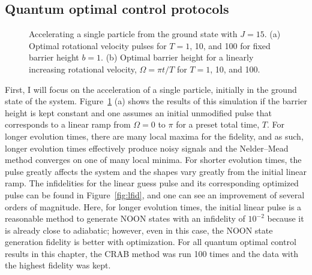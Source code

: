 \subsection{Quantum optimal control protocols}

\begin{figure}
 \centering
 \caption{Accelerating a single particle from the ground state with $J=15$.
 (a) Optimal rotational velocity pulses for $T = 1$, 10, and 100 for fixed barrier height $b=1$.
 (b) Optimal barrier height for a linearly increasing rotational velocity, $\Omega = \pi t/T$ for $T=1$, 10, and 100.}
 \label{fig:pulses}
\end{figure}

First, I will focus on the acceleration of a single particle, initially in the ground state of the system.
Figure~\ref{fig:pulses} (a) shows the results of this simulation if the barrier height is kept constant and one assumes an initial unmodified pulse that corresponds to a linear ramp from $\Omega = 0$ to $\pi$ for a preset total time, $T$.
For longer evolution times, there are many local maxima for the fidelity, and 
as such, longer evolution times effectively produce noisy signals and the Nelder--Mead method converges on one of many local minima.
For shorter evolution times, the pulse greatly affects the system and the shapes vary greatly from the initial linear ramp.
The infidelities for the linear guess pulse and its corresponding optimized pulse can be found in Figure~\ref{fig:lfid}, and one can see an improvement of several orders of magnitude.
Here, for longer evolution times, the initial linear pulse is a reasonable method to generate NOON states with an infidelity of $10^{-2}$ because it is already close to adiabatic; however, even in this case, the NOON state generation fidelity is better with optimization.
For all quantum optimal control results in this chapter, the CRAB method was run 100 times and the data with the highest fidelity was kept.

